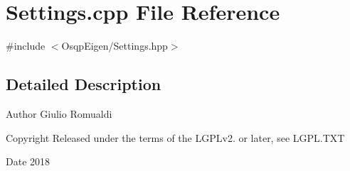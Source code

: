 \section{Settings.\+cpp File Reference}
\label{Settings_8cpp}
{\ttfamily \#include $<$Osqp\+Eigen/\+Settings.\+hpp$>$}\newline


\subsection{Detailed Description}
\begin{DoxyAuthor}{Author}
Giulio Romualdi 
\end{DoxyAuthor}
\begin{DoxyCopyright}{Copyright}
Released under the terms of the L\+G\+P\+Lv2. or later, see L\+G\+P\+L.\+T\+XT 
\end{DoxyCopyright}
\begin{DoxyDate}{Date}
2018 
\end{DoxyDate}
